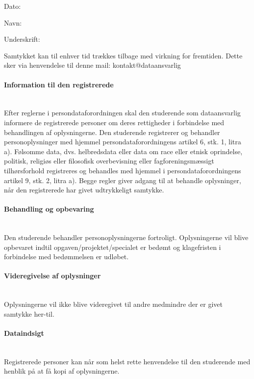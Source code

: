\documentclass[11pt, a4paper]{article}
\makeatletter
\newcommand{\mail}{ kontakt@dataansvarlig } 			%
\makeatother
\begin{document}
Dato: 
\vspace{5mm}

Navn: 
\vspace{5mm}

Underskrift: 
\vspace{5mm}

Samtykket kan til enhver tid trækkes tilbage med virkning for fremtiden. Dette sker via henvendelse til denne mail:  {\color{blue}\mail}


\paragraph{Information til den registrerede}~\\
Efter reglerne i persondataforordningen skal den studerende som dataansvarlig informere de registrerede personer om deres rettigheder i forbindelse med behandlingen af oplysningerne. Den studerende registrerer og behandler personoplysninger med hjemmel persondataforordningens artikel 6, stk. 1, litra a). Følsomme data, dvs. helbredsdata eller data om race eller etnisk oprindelse, politisk, religiøs eller filosofisk overbevisning eller fagforeningsmæssigt tilhørsforhold registreres og behandles med hjemmel i persondataforordningens artikel 9, stk. 2, litra a). Begge regler giver adgang til at behandle oplysninger, når den registrerede har givet udtrykkeligt samtykke.

\paragraph{Behandling og opbevaring}~\\
Den studerende behandler personoplysningerne fortroligt. Oplysningerne vil blive opbevaret indtil opgaven/projektet/specialet er bedømt og klagefristen i forbindelse med bedømmelsen er udløbet.

\paragraph{Videregivelse af oplysninger}~\\
Oplysningerne vil ikke blive videregivet til andre medmindre der er givet samtykke her-til.

\paragraph{Dataindsigt}~\\
Registrerede personer kan når som helst rette henvendelse til den studerende med henblik på at få kopi af oplysningerne.
\end{document}
